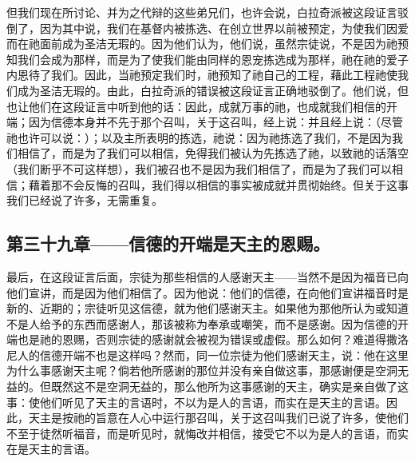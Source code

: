 但我们现在所讨论、并为之代辩的这些弟兄们，也许会说，白拉奇派被这段证言驳倒了，因为其中说，我们在基督内被拣选、在创立世界以前被预定，为使我们因爱而在祂面前成为圣洁无瑕的。因为他们认为，他们说，虽然宗徒说，不是因为祂预知我们会成为那样，而是为了使我们能由同样的恩宠拣选成为那样，祂在祂的爱子内恩待了我们。因此，当祂预定我们时，祂预知了祂自己的工程，藉此工程祂使我们成为圣洁无瑕的。由此，白拉奇派的错误被这段证言正确地驳倒了。他们说，但也让他们在这段证言中听到他的话：因此，成就万事的祂，也成就我们相信的开端；因为信德本身并不先于那个召叫，关于这召叫，经上说：并且经上说：（尽管祂也许可以说：）；以及主所表明的拣选，祂说：因为祂拣选了我们，不是因为我们相信了，而是为了我们可以相信，免得我们被认为先拣选了祂，以致祂的话落空（我们断乎不可这样想），我们被召也不是因为我们相信了，而是为了我们可以相信；藉着那不会反悔的召叫，我们得以相信的事实被成就并贯彻始终。但关于这事我们已经说了许多，无需重复。\par


\subsection{第三十九章——信德的开端是天主的恩赐。}

最后，在这段证言后面，宗徒为那些相信的人感谢天主——当然不是因为福音已向他们宣讲，而是因为他们相信了。因为他说：他们的信德，在向他们宣讲福音时是新的、近期的；宗徒听见这信德，就为他们感谢天主。如果他为那他所认为或知道不是人给予的东西而感谢人，那该被称为奉承或嘲笑，而不是感谢。因为信德的开端也是祂的恩赐，否则宗徒的感谢就会被视为错误或虚假。那么如何？难道得撒洛尼人的信德开端不也是这样吗？然而，同一位宗徒为他们感谢天主，说：他在这里为什么事感谢天主呢？倘若他所感谢的那位并没有亲自做这事，那感谢便是空洞无益的。但既然这不是空洞无益的，那么他所为这事感谢的天主，确实是亲自做了这事：使他们听见了天主的言语时，不以为是人的言语，而实在是天主的言语。因此，天主是按祂的旨意在人心中运行那召叫，关于这召叫我们已说了许多，使他们不至于徒然听福音，而是听见时，就悔改并相信，接受它不以为是人的言语，而实在是天主的言语。\par

